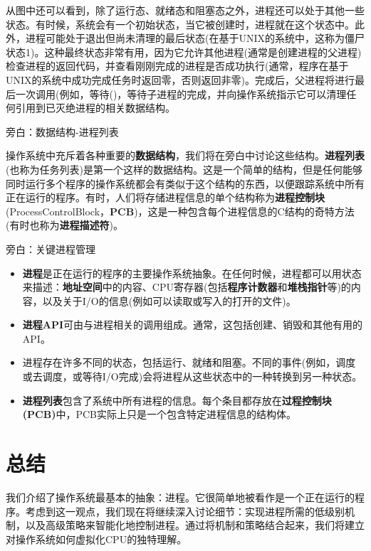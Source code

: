 从图中还可以看到，除了运行态、就绪态和阻塞态之外，进程还可以处于其他一些状态。有时候，系统会有一个初始状态，当它被创建时，进程就在这个状态中。此外，进程可能处于退出但尚未清理的最后状态(在基于UNIX的系统中，这称为僵尸状态1)。这种最终状态非常有用，因为它允许其他进程(通常是创建进程的父进程)检查进程的返回代码，并查看刚刚完成的进程是否成功执行(通常，程序在基于UNIX的系统中成功完成任务时返回零，否则返回非零)。完成后，父进程将进行最后一次调用(例如，等待()，等待子进程的完成，并向操作系统指示它可以清理任何引用到已灭绝进程的相关数据结构。

\begin{tcolorbox}[colframe=grey,colback= grey,arc=0pt,left=6pt,right=6pt,top=6pt,bottom=6pt,boxsep=0pt]
\begin{center}
旁白：数据结构-进程列表\\
\end{center}
操作系统中充斥着各种重要的\textbf{数据结构}，我们将在旁白中讨论这些结构。\textbf{进程列表}(也称为任务列表)是第一个这样的数据结构。这是一个简单的结构，但是任何能够同时运行多个程序的操作系统都会有类似于这个结构的东西，以便跟踪系统中所有正在运行的程序。有时，人们将存储进程信息的单个结构称为\textbf{进程控制块}(ProcessControlBlock，\textbf{PCB})，这是一种包含每个进程信息的C结构的奇特方法(有时也称为\textbf{进程描述符})。
\end{tcolorbox}

\begin{tcolorbox}[colframe=grey,colback= grey,arc=0pt,left=6pt,right=6pt,top=6pt,bottom=6pt,boxsep=0pt]
\begin{center}
旁白：关键进程管理\\
\end{center}
\begin{itemize}
\item \textbf{进程}是正在运行的程序的主要操作系统抽象。在任何时候，进程都可以用状态来描述：\textbf{地址空间}中的内容、CPU寄存器(包括\textbf{程序计数器}和\textbf{堆栈指针}等)的内容，以及关于I/O的信息(例如可以读取或写入的打开的文件)。
\item \textbf{进程API}可由与进程相关的调用组成。通常，这包括创建、销毁和其他有用的API。
\item 进程存在许多不同的状态，包括运行、就绪和阻塞。不同的事件(例如，调度或去调度，或等待I/O完成)会将进程从这些状态中的一种转换到另一种状态。
\item \textbf{进程列表}包含了系统中所有进程的信息。每个条目都存放在\textbf{过程控制块(PCB)}中，PCB实际上只是一个包含特定进程信息的结构体。
\end{itemize}
\end{tcolorbox}

\section{总结}
我们介绍了操作系统最基本的抽象：进程。它很简单地被看作是一个正在运行的程序。考虑到这一观点，我们现在将继续深入讨论细节：实现进程所需的低级别机制，以及高级策略来智能化地控制进程。通过将机制和策略结合起来，我们将建立对操作系统如何虚拟化CPU的独特理解。

